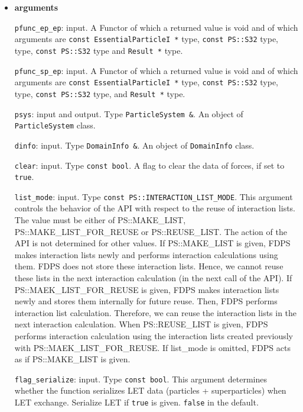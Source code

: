 \begin{itemize}

\item {\bf arguments}

{\tt pfunc\_ep\_ep}: input. A Functor of which a returned value is
void and of which arguments are {\tt const EssentialParticleI *} type, {\tt const PS::S32} type,  type, {\tt const PS::S32} type and {\tt Result *} type.

{\tt pfunc\_sp\_ep}: input. A Functor of which a returned value is
void and of which arguments are {\tt const EssentialParticleI *} type, {\tt const PS::S32} type,  type, {\tt const PS::S32} type, and {\tt Result *} type.

{\tt psys}: input and output. Type {\tt ParticleSystem \&}. An object of {\tt ParticleSystem} class.

{\tt dinfo}: input. Type {\tt DomainInfo \&}. An object of {\tt DomainInfo} class.

{\tt clear}: input. Type {\tt const bool}. A flag to clear the data of forces, if set to {\tt true}.

{\tt list\_mode}: input. Type {\tt const PS::INTERACTION\_LIST\_MODE}. This argument controls the behavior of the API with respect to the reuse of interaction lists. The value must be either of PS::MAKE\_LIST, PS::MAKE\_LIST\_FOR\_REUSE or PS::REUSE\_LIST. The action of the API is not determined for other values. If PS::MAKE\_LIST is given, FDPS makes interaction lists newly and performs interaction calculations using them. FDPS does not store these interaction lists. Hence, we cannot reuse these lists in the next interaction calculation (in the next call of the API). If PS::MAEK\_LIST\_FOR\_REUSE is given, FDPS makes interaction lists newly and stores them internally for future reuse. Then, FDPS performs interaction list calculation. Therefore, we can reuse the interaction lists in the next interaction calculation. When PS::REUSE\_LIST is given, FDPS performs interaction calculation using the interaction lists created previously with PS::MAEK\_LIST\_FOR\_REUSE. If list\_mode is omitted, FDPS acts as if PS::MAKE\_LIST is given.

\texttt{flag\_serialize}: input. Type \texttt{const bool}. This argument determines whether the function serializes LET data  (particles + superparticles) when LET exchange. Serialize LET if \texttt{true} is given. \texttt{false} in the default.


\end{itemize}
